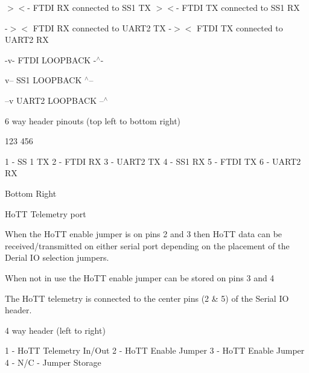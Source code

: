 $>$$<$-\/ F\+T\+D\+I R\+X connected to S\+S1 T\+X $>$$<$-\/ F\+T\+D\+I T\+X connected to S\+S1 R\+X

-\/$>$$<$ F\+T\+D\+I R\+X connected to U\+A\+R\+T2 T\+X -\/$>$$<$ F\+T\+D\+I T\+X connected to U\+A\+R\+T2 R\+X

-\/v-\/ F\+T\+D\+I L\+O\+O\+P\+B\+A\+C\+K -\/$^\wedge$-\/

v-- S\+S1 L\+O\+O\+P\+B\+A\+C\+K $^\wedge$--

--v U\+A\+R\+T2 L\+O\+O\+P\+B\+A\+C\+K --$^\wedge$

6 way header pinouts (top left to bottom right)

123 456

1 -\/ S\+S 1 T\+X 2 -\/ F\+T\+D\+I R\+X 3 -\/ U\+A\+R\+T2 T\+X 4 -\/ S\+S1 R\+X 5 -\/ F\+T\+D\+I T\+X 6 -\/ U\+A\+R\+T2 R\+X

Bottom Right

Ho\+T\+T Telemetry port

When the Ho\+T\+T enable jumper is on pins 2 and 3 then Ho\+T\+T data can be received/transmitted on either serial port depending on the placement of the Derial I\+O selection jumpers.

When not in use the Ho\+T\+T enable jumper can be stored on pins 3 and 4

The Ho\+T\+T telemetry is connected to the center pins (2 \& 5) of the Serial I\+O header.

4 way header (left to right)

1 -\/ Ho\+T\+T Telemetry In/\+Out 2 -\/ Ho\+T\+T Enable Jumper 3 -\/ Ho\+T\+T Enable Jumper 4 -\/ N/\+C -\/ Jumper Storage 